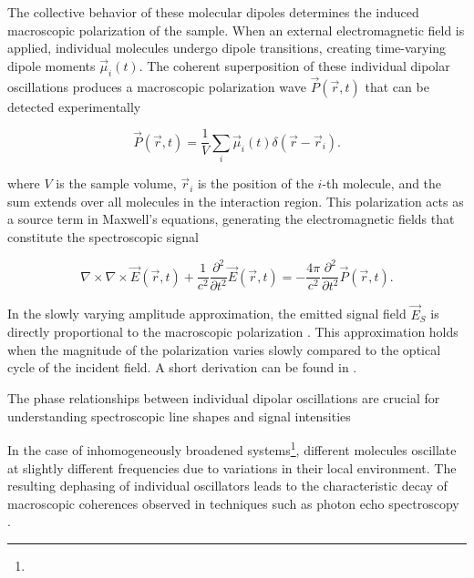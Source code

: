 \noindent 
The collective behavior of these molecular dipoles determines the induced macroscopic polarization of the sample. When an external electromagnetic field is applied, individual molecules undergo dipole transitions, creating time-varying dipole moments $\vec{\mu}_i(t)$. The coherent superposition of these individual dipolar oscillations produces a macroscopic polarization wave $\vec{P}(\vec{r}, t)$ that can be detected experimentally

\begin{equation}
	\vec{P}(\vec{r}, t) = \frac{1}{V} \sum_{i} \vec{\mu}_i(t) \delta(\vec{r} - \vec{r}_i).
	\label{eq:macroscopic_polarization}
\end{equation}

\noindent 
where $V$ is the sample volume, $\vec{r}_i$ is the position of the $i$-th molecule, and the sum extends over all molecules in the interaction region. This polarization acts as a source term in Maxwell's equations, generating the electromagnetic fields that constitute the spectroscopic signal \cite{abramaviciusetal2009coherentmultidimensionaloptical}

\begin{equation}
	\nabla \times \nabla \times \vec{E}(\vec{r}, t) + \frac{1}{c^2} \frac{\partial^2}{\partial t^2} \vec{E}(\vec{r}, t) = - \frac{4 \pi}{c^2} \frac{\partial^2}{\partial t^2} \vec{P}(\vec{r}, t).
\end{equation}

\noindent
In the slowly varying amplitude approximation, the emitted signal field $\vec{E}_S$ is directly proportional to the macroscopic polarization \cite{mukamel1995principlesnonlinearoptical}. This approximation holds when the magnitude of the polarization varies slowly compared to the optical cycle of the incident field. A short derivation can be found in \cite{boyd2008chapter6nonlinear}.

\noindent 
{}
The phase relationships between individual dipolar oscillations are crucial for understanding spectroscopic line shapes and signal intensities

\noindent 
In the case of inhomogeneously broadened systems\footnote{}, different molecules oscillate at slightly different frequencies due to variations in their local environment. The resulting dephasing of individual oscillators leads to the characteristic decay of macroscopic coherences observed in techniques such as photon echo spectroscopy \cite{mukamel1995principlesnonlinearoptical}.


